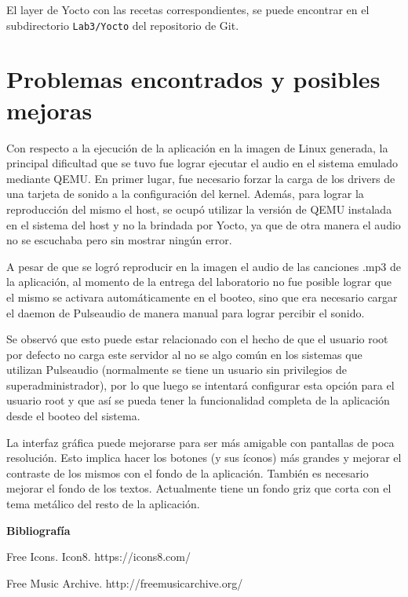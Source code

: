 El layer de Yocto con las recetas correspondientes, se puede encontrar en el
subdirectorio \texttt{Lab3/Yocto} del repositorio de Git.


\section{Problemas encontrados y posibles mejoras}
\label{sec:possible_fixes}
Con respecto a la ejecución de la aplicación en la imagen de Linux generada, la
principal dificultad que se tuvo fue lograr ejecutar el audio en el sistema
emulado mediante QEMU. En primer lugar, fue necesario forzar la carga de los
drivers de una tarjeta de sonido a la configuración del kernel. Además, para
lograr la reproducción del mismo el host, se ocupó utilizar la versión de QEMU
instalada en el sistema del host y no la brindada por Yocto, ya que de otra
manera el audio no se escuchaba pero sin mostrar ningún error.

A pesar de que se logró reproducir en la imagen el audio de las canciones .mp3 de la
aplicación, al momento de la entrega del laboratorio no fue posible lograr que
el mismo se activara automáticamente en el booteo, sino que era necesario
cargar el daemon de Pulseaudio de manera manual para lograr percibir el
sonido.

Se observó que esto puede estar relacionado con el hecho de que el
usuario root por defecto no carga este servidor al no se algo común en los
sistemas que utilizan Pulseaudio (normalmente se tiene un usuario sin
privilegios de superadministrador), por lo que luego se intentará configurar
esta opción para el usuario root y que así se pueda tener la funcionalidad
completa de la aplicación desde el booteo del sistema.


La interfaz gráfica puede mejorarse para ser más amigable con pantallas de poca resolución. Esto
implica hacer los botones (y sus íconos) más grandes y mejorar el contraste de los mismos con el
fondo de la aplicación. También es necesario mejorar el fondo de los textos. Actualmente tiene un
fondo griz que corta con el tema metálico del resto de la aplicación. 


%


\textbf{ Bibliografía}

Free Icons. Icon8. https://icons8.com/

Free Music Archive. http://freemusicarchive.org/
%
%
